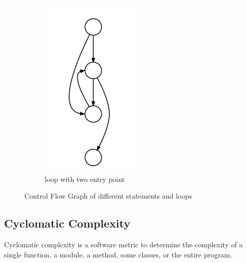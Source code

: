 \begin{figure}[h]
\begin{subfigure}[t]{.24\textwidth}
	\includegraphics[width=\linewidth]{cfgd.png}
	\caption{loop with two entry point}\label{fig:cfgd}		
	\end{subfigure}

	\caption{Control Flow Graph of different statements and loops}\label{fig:cfg}
\end{figure}

\subsection{Cyclomatic Complexity}
Cyclomatic complexity is a software metric to determine the complexity of a single function, a module, a method, some classes, or the entire program.

